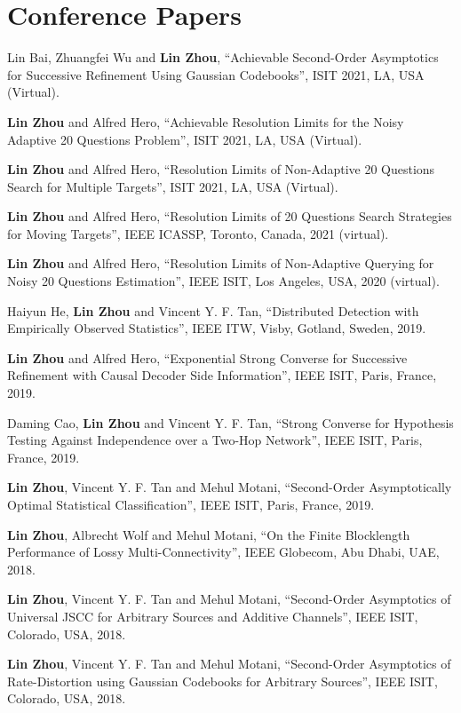 \documentclass[12pt]{article} %
\begin{document}
\section{Conference Papers}
\begin{etaremune}
\item Lin Bai, Zhuangfei Wu and \textbf{Lin Zhou}, ``Achievable Second-Order Asymptotics for Successive Refinement Using Gaussian Codebooks'', ISIT 2021, LA, USA (Virtual).
\item \textbf{Lin Zhou} and Alfred Hero, ``Achievable Resolution Limits for the Noisy Adaptive 20 Questions Problem'', ISIT 2021, LA, USA (Virtual).
\item \textbf{Lin Zhou} and Alfred Hero, ``Resolution Limits of Non-Adaptive 20 Questions Search for Multiple Targets'',  ISIT 2021, LA, USA (Virtual).
\item \textbf{Lin Zhou} and Alfred Hero, ``Resolution Limits of 20 Questions Search Strategies for Moving Targets'', IEEE ICASSP, Toronto, Canada, 2021 (virtual).
\item \textbf{Lin Zhou} and Alfred Hero, ``Resolution Limits of Non-Adaptive Querying for Noisy 20 Questions Estimation'', IEEE ISIT, Los Angeles, USA, 2020 (virtual).
\item Haiyun He, \textbf{Lin Zhou} and Vincent Y. F. Tan, ``Distributed Detection with Empirically Observed Statistics'', IEEE ITW, Visby, Gotland, Sweden, 2019.
\item \textbf{Lin Zhou} and Alfred Hero, ``Exponential Strong Converse for Successive Refinement with Causal Decoder Side Information'', IEEE ISIT, Paris, France, 2019.
\item Daming Cao, \textbf{Lin Zhou} and Vincent Y. F. Tan, ``Strong Converse for Hypothesis Testing Against Independence over a Two-Hop Network'', IEEE ISIT, Paris, France, 2019.
\item \textbf{Lin Zhou}, Vincent Y. F. Tan and Mehul Motani, ``Second-Order Asymptotically Optimal Statistical Classification'', IEEE ISIT, Paris, France, 2019.
\item \textbf{Lin Zhou}, Albrecht Wolf and Mehul Motani, ``On the Finite Blocklength Performance of Lossy Multi-Connectivity'', IEEE Globecom, Abu Dhabi, UAE, 2018.
\item \textbf{Lin Zhou}, Vincent Y. F. Tan and Mehul Motani,  ``Second-Order Asymptotics of Universal JSCC for Arbitrary Sources and Additive Channels'', IEEE ISIT, Colorado, USA, 2018.
\item \textbf{Lin Zhou}, Vincent Y. F. Tan and Mehul Motani, ``Second-Order Asymptotics of Rate-Distortion using Gaussian Codebooks for Arbitrary Sources'', IEEE ISIT, Colorado, USA, 2018.

\end{etaremune}
\end{document}
